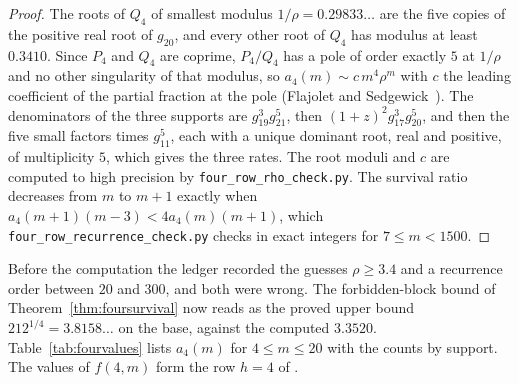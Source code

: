 \begin{proof}
The roots of $Q_4$ of smallest modulus $1/\rho=0.29833\ldots$ are the five copies of the positive real root of $g_{20}$, and every other root of $Q_4$ has modulus at least $0.3410$. Since $P_4$ and $Q_4$ are coprime, $P_4/Q_4$ has a pole of order exactly $5$ at $1/\rho$ and no other singularity of that modulus, so $a_4(m)\sim c\,m^4\rho^m$ with $c$ the leading coefficient of the partial fraction at the pole (Flajolet and Sedgewick~\cite[Section~IV.5]{flajolet2009}). The denominators of the three supports are $g_{19}^3g_{21}^5$, then $(1+z)^2g_{17}^3g_{20}^5$, and then the five small factors times $g_{11}^5$, each with a unique dominant root, real and positive, of multiplicity $5$, which gives the three rates. The root moduli and $c$ are computed to high precision by \texttt{four\_row\_rho\_check.py}. The survival ratio decreases from $m$ to $m+1$ exactly when $a_4(m+1)(m-3)<4a_4(m)(m+1)$, which \texttt{four\_row\_recurrence\_check.py} checks in exact integers for $7\le m<1500$.
\end{proof}

Before the computation the ledger recorded the guesses $\rho\ge3.4$ and a recurrence order between $20$ and $300$, and both were wrong. The forbidden-block bound of Theorem~\ref{thm:foursurvival} now reads as the proved upper bound $212^{1/4}=3.8158\ldots$ on the base, against the computed $3.3520$. Table~\ref{tab:fourvalues} lists $a_4(m)$ for $4\le m\le20$ with the counts by support. The values of $f(4,m)$ form the row $h=4$ of .

